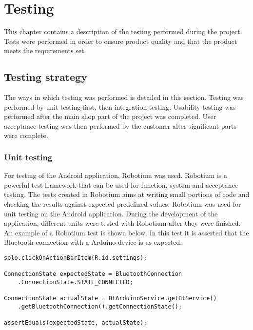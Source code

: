 \chapter{Testing}
	This chapter contains a description of the testing performed during the project. Tests were performed in order to ensure product quality and that the product meets the requirements set. 
	
	\section{Testing strategy}
		The ways in which testing was performed is detailed in this section. Testing was performed by unit testing first, then integration testing. Usability testing was performed after the main shop part of the project was completed. User acceptance testing was then performed by the customer after significant parts were complete.

		\subsection{Unit testing}
			For testing of the Android application, Robotium was used. Robotium is a powerful test framework that can be used for function, system and acceptance testing. The tests created in Robotium aims at writing small portions of code and checking the results against expected predefined values. Robotium was used for unit testing on the Android application. During the development of the application, different units were tested with Robotium after they were finished. An example of a Robotium test is shown below. In this test it is asserted that the Bluetooth connection with a Arduino device is as expected. \\

			\begin{lstlisting}
solo.clickOnActionBarItem(R.id.settings);

ConnectionState expectedState = BluetoothConnection
	.ConnectionState.STATE_CONNECTED;
	
ConnectionState actualState = BtArduinoService.getBtService()
	.getBluetoothConnection().getConnectionState();

assertEquals(expectedState, actualState);
			\end{lstlisting}

